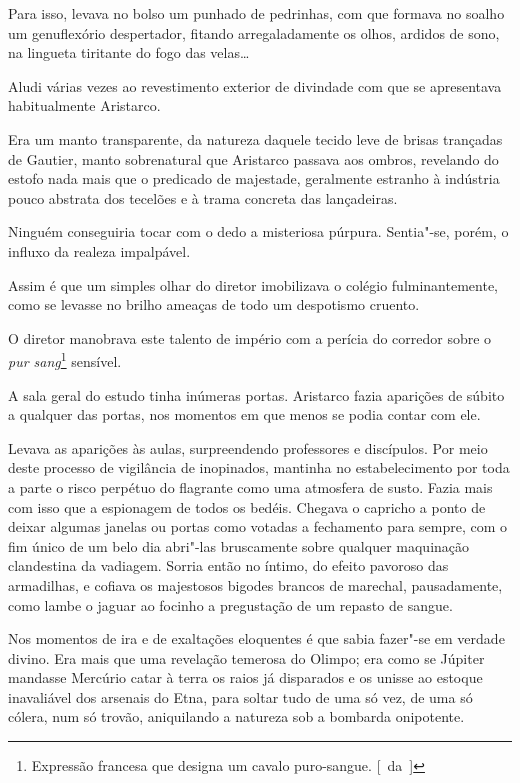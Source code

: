 Para isso, levava no bolso um punhado de pedrinhas, com que
formava no soalho um genuflexório despertador, fitando arregaladamente
os olhos, ardidos de sono, na lingueta tiritante do fogo das velas\ldots{}

Aludi várias vezes ao revestimento exterior de divindade com que se
apresentava habitualmente Aristarco. 

Era um manto transparente, da
natureza daquele tecido leve de brisas trançadas de Gautier, manto
sobrenatural que Aristarco passava aos ombros, revelando do estofo nada
mais que o predicado de majestade, geralmente estranho à indústria
pouco abstrata dos tecelões e à trama concreta das lançadeiras. 

Ninguém conseguiria tocar com o dedo a misteriosa púrpura. Sentia"-se, porém,
o influxo da realeza impalpável.

Assim é que um simples olhar do diretor imobilizava o colégio
fulminantemente, como se levasse no brilho ameaças de todo um
despotismo cruento. 

O diretor manobrava este talento de império com a
perícia do corredor sobre o \textit{pur sang}\footnote{ Expressão francesa que designa 
um cavalo puro-sangue. [~da~]} sensível. 

A sala geral do estudo
tinha inúmeras portas. Aristarco fazia aparições de súbito a qualquer
das portas, nos momentos em que menos se podia contar com ele. 

Levava as aparições às aulas, surpreendendo professores e discípulos. Por meio
deste processo de vigilância de inopinados, mantinha no estabelecimento
por toda a parte o risco perpétuo do flagrante como uma atmosfera de
susto. Fazia mais com isso que a espionagem de todos os bedéis. Chegava
o capricho a ponto de deixar algumas janelas ou portas como votadas a
fechamento para sempre, com o fim único de um belo dia abri"-las
bruscamente sobre qualquer maquinação clandestina da vadiagem. Sorria
então no íntimo, do efeito pavoroso das armadilhas, e cofiava os
majestosos bigodes brancos de marechal, pausadamente, como lambe o
jaguar ao focinho a pregustação de um repasto de sangue. 

Nos momentos de ira e de exaltações eloquentes é que sabia fazer"-se em verdade
divino. Era mais que uma revelação temerosa do Olimpo; era como se
Júpiter mandasse Mercúrio catar à terra os raios já disparados e os
unisse ao estoque inavaliável dos arsenais do Etna, para soltar tudo de
uma só vez, de uma só cólera, num só trovão, aniquilando a natureza sob
a bombarda onipotente. 

